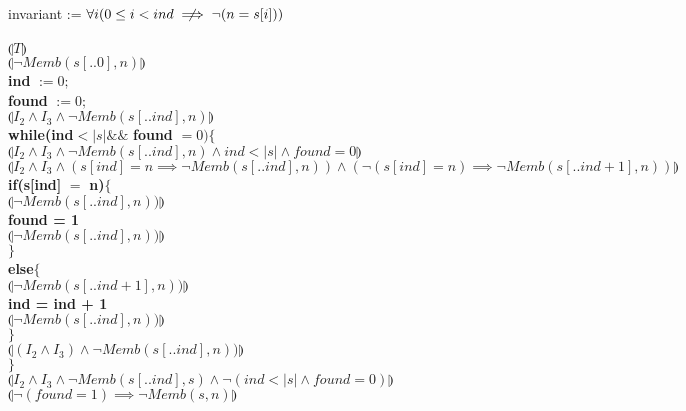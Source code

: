 \documentclass[12pt]{article}
\newcommand\abs[1]{\left|#1\right|}
\begin{document}
\noindent invariant := $\forall i(0 \leq i < ind \centernot\implies \neg(n=s[i]))$ \\ 
\\ 
$\limg T \rimg$ \\
$\limg \neg Memb(s[..0], n) \rimg$ \\
\textbf{ind} $:= 0;$ \\
\textbf{found} $:= 0;$ \\
$\limg I_2 \land I_3 \land \neg Memb(s[..ind], n) \rimg$ \\
\textbf{while(ind}$< \abs{s} \&\&$ \textbf{found} $= 0)$\textbf{$\{$} \\
\hspace*{10mm}$\limg I_2 \land I_3 \land \neg Memb(s[..ind], n) \land ind < \abs{s} \land found = 0\rimg$ \\
\hspace*{10mm}$\limg I_2 \land I_3 \land (s[ind] = n \implies \neg Memb(s[..ind], n)) \land (\neg(s[ind] = n) \implies \neg Memb(s[..ind+1], n))\rimg$ \\
\hspace*{10mm}\textbf{if(s[ind]} $=$ \textbf{n)$\{$} \\ 
\hspace*{20mm}$\limg \neg Memb(s[..ind], n))\rimg$ \\
\hspace*{20mm}\textbf{found = 1} \\ 
\hspace*{20mm}$\limg \neg Memb(s[..ind], n))\rimg$ \\
\hspace*{10mm}\textbf{$\}$} \\ 
\hspace*{10mm}\textbf{else$\{$} \\
\hspace*{20mm}$\limg \neg Memb(s[..ind+1], n))\rimg$ \\
\hspace*{20mm}\textbf{ind = ind + 1} \\
\hspace*{20mm}$\limg \neg Memb(s[..ind], n))\rimg$ \\
\hspace*{10mm}\textbf{$\}$} \\ 
\hspace*{10mm}$\limg (I_2 \land I_3) \land \neg Memb(s[..ind], n))\rimg$ \\
\textbf{$\}$} \\ 
$\limg I_2 \land I_3 \land \neg Memb(s[..ind], s) \land \neg(ind < \abs{s} \land found = 0)\rimg$ \\ 
$\limg \neg(found=1) \implies \neg Memb(s,n) \rimg$ \\ \\
\end{document}
